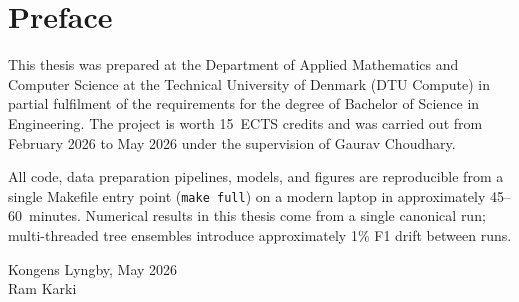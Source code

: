 \chapter*{Preface}

This thesis was prepared at the Department of Applied Mathematics and
Computer Science at the Technical University of Denmark (DTU Compute) in
partial fulfilment of the requirements for the degree of Bachelor of
Science in Engineering. The project is worth 15~ECTS credits and was
carried out from February 2026 to May 2026 under the supervision of
Gaurav Choudhary.

All code, data preparation pipelines, models, and figures are reproducible
from a single Makefile entry point (\texttt{make full}) on a modern laptop
in approximately 45--60~minutes. Numerical results in this thesis come
from a single canonical run; multi-threaded tree ensembles introduce
approximately 1\% F1 drift between runs.

\bigskip
\noindent Kongens Lyngby, May 2026\\
Ram Karki
